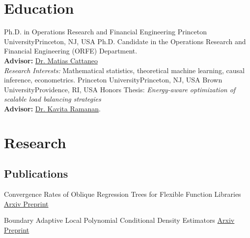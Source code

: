 \documentclass[10pt,a4paper,roman]{moderncv}        %
\begin{document}
\makecvtitle

\section{Education}
{Ph.D. in Operations Research and Financial Engineering}
{Princeton University}{Princeton, NJ, USA}{}
{Ph.D. Candidate in the Operations Research and Financial Engineering (ORFE) Department.\\
\textbf{Advisor: }\color{blue}\href{https://cattaneo.princeton.edu}{Dr. Matias Cattaneo}\color{black}\\
\textit{Research Interests:} Mathematical statistics, theoretical machine learning, causal inference, econometrics.}
{Princeton University}{Princeton, NJ, USA}{}{}
{Brown University}{Providence, RI, USA}{}{ Honors Thesis: \textit{Energy-aware optimization of scalable load balancing
    strategies}
  \\
  \textbf{Advisor: }
  \color{blue}\href{https://www.brown.edu/academics/applied-mathematics/faculty/kavita-ramanan/home}
  {Dr. Kavita Ramanan}\color{black}.}  %

\section{Research}
\subsection{Publications}
{Convergence Rates of Oblique Regression Trees for Flexible Function Libraries}
{\color{blue}\href{https://arxiv.org/abs/2210.14429}{Arxiv Preprint}\color{black}}{}
{}

{Boundary Adaptive Local Polynomial Conditional Density Estimators}
{\color{blue}\href{https://arxiv.org/abs/2204.10359}{Arxiv Preprint}\color{black}}{}
{}
\end{document}
